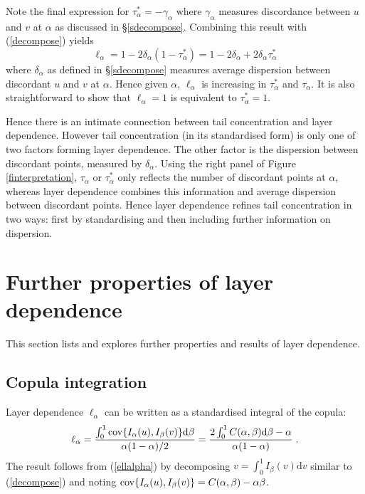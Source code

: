 \documentclass[authoryear]{elsarticle}
\newcommand{\cov}{{\rm cov}}
\newcommand{\de}{\mathrm{d}}
\newcommand{\eref}[1]{(\ref{#1})}
\newcommand{\fref}[1]{Figure \ref{#1}}
\newcommand{\sref}[1]{\S\ref{#1}}
\begin{document}
Note the final expression for $\tau_\alpha^*=-\gamma_\alpha$ where $\gamma_\alpha$ measures discordance between $u$ and $v$ at $\alpha$ as discussed in \sref{sdecompose}. Combining this result with \eref{decompose} yields
$$
\ell_\alpha=1-2\delta_\alpha(1-\tau_\alpha^*) = 1-2\delta_\alpha + 2\delta_\alpha \tau_\alpha^*
$$
where $\delta_\alpha$ as defined in \sref{sdecompose} measures average dispersion between discordant $u$ and $v$ at $\alpha$. Hence given $\alpha$, $\ell_\alpha$ is increasing in $\tau_\alpha^*$ and $\tau_\alpha$. It is also straightforward to show that $\ell_\alpha=1$ is equivalent to $\tau_\alpha^*=1$.

Hence there is an intimate connection between tail concentration and layer dependence. However tail concentration (in its standardised form) is only one of two factors forming layer dependence. The other factor is the dispersion between discordant points, measured by $\delta_\alpha$. Using the right panel of \fref{finterpretation}, $\tau_\alpha$ or $\tau_\alpha^*$ only reflects the number of discordant points at $\alpha$, whereas layer dependence combines this information and average dispersion between discordant points. Hence layer dependence refines tail concentration in two ways: first by standardising and then including further information on dispersion.





\section{Further properties of layer dependence}\label{sproperties}

This section lists and explores further properties and results of layer dependence.




\subsection{Copula integration}

Layer dependence $\ell_\alpha$ can be written as a standardised integral of the copula:
\begin{equation}\label{copula}
\ell_\alpha = \frac{\int_0^1 \cov\{I_\alpha(u),I_\beta(v)\} \de\beta }{\alpha(1-\alpha)/2}
= \frac{2 \int_0^1 C(\alpha,\beta) \de \beta- \alpha}{\alpha(1-\alpha)} \;.
\end{equation}
The result follows from \eref{ellalpha} by decomposing $v=\int_0^1 I_\beta(v)\de v$ similar to \eref{decompose} and noting $\cov\{I_\alpha(u),I_\beta(v)\}=C(\alpha,\beta)-\alpha\beta$.
\end{document}

